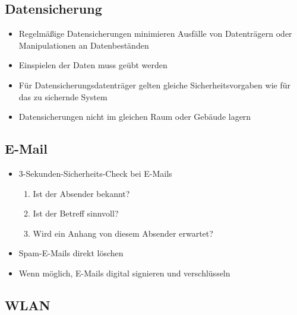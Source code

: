 \subsection{Datensicherung}

\begin{frame}
\begin{itemize}
	\item Regelmäßige Datensicherungen minimieren Ausfälle von Datenträgern oder Manipulationen an Datenbeständen
	\item Einspielen der Daten muss geübt werden
	\item Für Datensicherungsdatenträger gelten gleiche Sicherheitsvorgaben wie für das zu sichernde System
	\item Datensicherungen nicht im gleichen Raum oder Gebäude lagern
\end{itemize}
\end{frame}

\subsection{E-Mail}

\begin{frame}
\begin{itemize}
	\item 3-Sekunden-Sicherheits-Check bei E-Mails
	\begin{enumerate}
		\item Ist der Absender bekannt?
		\item Ist der Betreff sinnvoll?
		\item Wird ein Anhang von diesem Absender erwartet?
	\end{enumerate}
	\item Spam-E-Mails direkt löschen
	\item Wenn möglich, E-Mails digital signieren und verschlüsseln
\end{itemize}
\end{frame}

\subsection{WLAN}

